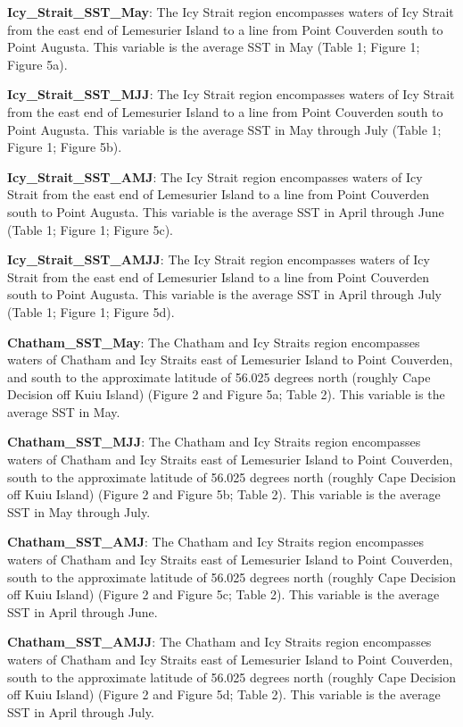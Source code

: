 \documentclass[
]{article}
\begin{document}
\textbf{Icy\_Strait\_SST\_May}: The Icy Strait region encompasses waters
of Icy Strait from the east end of Lemesurier Island to a line from
Point Couverden south to Point Augusta. This variable is the average SST
in May (Table 1; Figure 1; Figure 5a).

\textbf{Icy\_Strait\_SST\_MJJ}: The Icy Strait region encompasses waters
of Icy Strait from the east end of Lemesurier Island to a line from
Point Couverden south to Point Augusta. This variable is the average SST
in May through July (Table 1; Figure 1; Figure 5b).

\textbf{Icy\_Strait\_SST\_AMJ}: The Icy Strait region encompasses waters
of Icy Strait from the east end of Lemesurier Island to a line from
Point Couverden south to Point Augusta. This variable is the average SST
in April through June (Table 1; Figure 1; Figure 5c).

\textbf{Icy\_Strait\_SST\_AMJJ}: The Icy Strait region encompasses
waters of Icy Strait from the east end of Lemesurier Island to a line
from Point Couverden south to Point Augusta. This variable is the
average SST in April through July (Table 1; Figure 1; Figure 5d).

\textbf{Chatham\_SST\_May}: The Chatham and Icy Straits region
encompasses waters of Chatham and Icy Straits east of Lemesurier Island
to Point Couverden, and south to the approximate latitude of 56.025
degrees north (roughly Cape Decision off Kuiu Island) (Figure 2 and
Figure 5a; Table 2). This variable is the average SST in May.

\textbf{Chatham\_SST\_MJJ}: The Chatham and Icy Straits region
encompasses waters of Chatham and Icy Straits east of Lemesurier Island
to Point Couverden, south to the approximate latitude of 56.025 degrees
north (roughly Cape Decision off Kuiu Island) (Figure 2 and Figure 5b;
Table 2). This variable is the average SST in May through July.

\textbf{Chatham\_SST\_AMJ}: The Chatham and Icy Straits region
encompasses waters of Chatham and Icy Straits east of Lemesurier Island
to Point Couverden, south to the approximate latitude of 56.025 degrees
north (roughly Cape Decision off Kuiu Island) (Figure 2 and Figure 5c;
Table 2). This variable is the average SST in April through June.

\textbf{Chatham\_SST\_AMJJ}: The Chatham and Icy Straits region
encompasses waters of Chatham and Icy Straits east of Lemesurier Island
to Point Couverden, south to the approximate latitude of 56.025 degrees
north (roughly Cape Decision off Kuiu Island) (Figure 2 and Figure 5d;
Table 2). This variable is the average SST in April through July.
\end{document}
